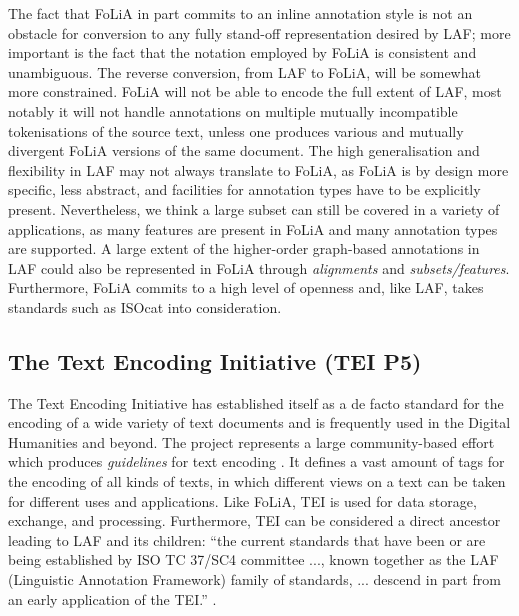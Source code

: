 \documentclass[a4paper,10pt,twoside]{article}
\begin{document}
The fact that FoLiA in part commits to an inline annotation style is not an
obstacle for conversion to any fully stand-off representation desired by LAF;
more important is the fact that the notation employed by FoLiA is consistent
and unambiguous. The reverse conversion, from LAF to FoLiA, will be somewhat
more constrained. FoLiA will not be able to encode the full extent of LAF, most
notably it will not handle annotations on multiple mutually incompatible
tokenisations of the source text, unless one produces various and mutually
divergent FoLiA versions of the same document. The high generalisation and
flexibility in LAF may not always translate to FoLiA, as FoLiA is by design
more specific, less abstract, and facilities for annotation types have to be
explicitly present. Nevertheless, we think a large subset can still be covered
in a variety of applications, as many features are present in FoLiA and many
annotation types are supported. A large extent of the higher-order graph-based
annotations in LAF could also be represented in FoLiA through \emph{alignments}
and \emph{subsets/features}. Furthermore, FoLiA commits to a high level of
openness and, like LAF, takes standards such as ISOcat \cite{ISOCAT} into
consideration. %


\subsection{The Text Encoding Initiative (TEI P5)}

The Text Encoding Initiative has established itself as a de facto standard for
the encoding of a wide variety of text documents and is frequently used in the
Digital Humanities and beyond. The project represents a large community-based
effort which produces \emph{guidelines} for text encoding \cite{TEI}. It
defines a vast amount of tags for the encoding of all kinds of texts, in which
different views on a text can be taken for different uses and applications.
Like FoLiA, TEI is used for data storage, exchange, and processing.
Furthermore, TEI can be considered a direct ancestor leading to LAF and its
children: ``the current standards that have been or are being established by ISO
TC 37/SC4 committee ..., known together as the LAF (Linguistic Annotation Framework) family of standards, ... descend
in part from an early application of the TEI.'' \cite{TEICORPUSANNOT}. 
\end{document}
